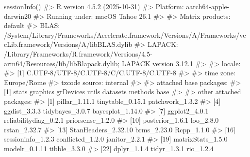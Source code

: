 \documentclass[
  letterpaper,
  DIV=11,
  numbers=noendperiod,
  oneside]{scrreprt}
\newenvironment{Shaded}{\begin{snugshade}}{\end{snugshade}}
\newcommand{\CommentTok}[1]{\textcolor[rgb]{0.37,0.37,0.37}{#1}}
\newcommand{\FunctionTok}[1]{\textcolor[rgb]{0.28,0.35,0.67}{#1}}
\newcommand{\NormalTok}[1]{\textcolor[rgb]{0.00,0.23,0.31}{#1}}
\theoremstyle{definition}
\theoremstyle{plain}
\theoremstyle{definition}
\theoremstyle{remark}
\begin{document}
\begin{tcolorbox}[enhanced jigsaw, arc=.35mm, breakable, colbacktitle=quarto-callout-note-color!10!white, opacityback=0, toprule=.15mm, rightrule=.15mm, colback=white, opacitybacktitle=0.6, leftrule=.75mm, coltitle=black, bottomtitle=1mm, left=2mm, toptitle=1mm, title=\textcolor{quarto-callout-note-color}{\faInfo}\hspace{0.5em}{Informazioni sull'ambiente di sviluppo}, titlerule=0mm, bottomrule=.15mm, colframe=quarto-callout-note-color-frame]

\begin{Shaded}
\begin{Highlighting}[]
\FunctionTok{sessionInfo}\NormalTok{()}
\CommentTok{\#\textgreater{} R version 4.5.2 (2025{-}10{-}31)}
\CommentTok{\#\textgreater{} Platform: aarch64{-}apple{-}darwin20}
\CommentTok{\#\textgreater{} Running under: macOS Tahoe 26.1}
\CommentTok{\#\textgreater{} }
\CommentTok{\#\textgreater{} Matrix products: default}
\CommentTok{\#\textgreater{} BLAS:   /System/Library/Frameworks/Accelerate.framework/Versions/A/Frameworks/vecLib.framework/Versions/A/libBLAS.dylib }
\CommentTok{\#\textgreater{} LAPACK: /Library/Frameworks/R.framework/Versions/4.5{-}arm64/Resources/lib/libRlapack.dylib;  LAPACK version 3.12.1}
\CommentTok{\#\textgreater{} }
\CommentTok{\#\textgreater{} locale:}
\CommentTok{\#\textgreater{} [1] C.UTF{-}8/UTF{-}8/C.UTF{-}8/C/C.UTF{-}8/C.UTF{-}8}
\CommentTok{\#\textgreater{} }
\CommentTok{\#\textgreater{} time zone: Europe/Rome}
\CommentTok{\#\textgreater{} tzcode source: internal}
\CommentTok{\#\textgreater{} }
\CommentTok{\#\textgreater{} attached base packages:}
\CommentTok{\#\textgreater{} [1] stats     graphics  grDevices utils     datasets  methods   base     }
\CommentTok{\#\textgreater{} }
\CommentTok{\#\textgreater{} other attached packages:}
\CommentTok{\#\textgreater{}  [1] pillar\_1.11.1         tinytable\_0.15.1      patchwork\_1.3.2      }
\CommentTok{\#\textgreater{}  [4] ggdist\_3.3.3          tidybayes\_3.0.7       bayesplot\_1.14.0     }
\CommentTok{\#\textgreater{}  [7] ggplot2\_4.0.1         reliabilitydiag\_0.2.1 priorsense\_1.2.0     }
\CommentTok{\#\textgreater{} [10] posterior\_1.6.1       loo\_2.8.0             rstan\_2.32.7         }
\CommentTok{\#\textgreater{} [13] StanHeaders\_2.32.10   brms\_2.23.0           Rcpp\_1.1.0           }
\CommentTok{\#\textgreater{} [16] sessioninfo\_1.2.3     conflicted\_1.2.0      janitor\_2.2.1        }
\CommentTok{\#\textgreater{} [19] matrixStats\_1.5.0     modelr\_0.1.11         tibble\_3.3.0         }
\CommentTok{\#\textgreater{} [22] dplyr\_1.1.4           tidyr\_1.3.1           rio\_1.2.4            }

\end{Highlighting}
\end{Shaded}
\end{tcolorbox}
\end{document}
